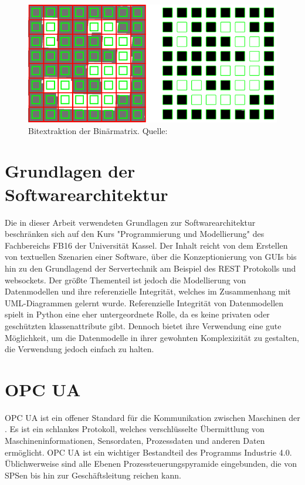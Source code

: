 \begin{figure}
    \caption{Bitextraktion der Binärmatrix. Quelle: \cite[OpenCV]{OpenCVaruco}}\label{fig:aruco6}
    \includegraphics[width = \textwidth]{Bilder/bitsextraction2.png}
    \centering
\end{figure}



\section{Grundlagen der Softwarearchitektur}

Die in dieser Arbeit verwendeten Grundlagen zur Softwarearchitektur beschränken sich auf den Kurs "Programmierung und Modellierung" des Fachbereichs
FB16 der Universität Kassel. Der Inhalt reicht von dem Erstellen von textuellen Szenarien einer Software, über die Konzeptionierung von GUIs bis hin
zu den Grundlagend der Servertechnik am Beispiel des REST Protokolls und websockets. 
Der größte Thementeil ist jedoch die Modellierung von Datenmodellen und ihre referenzielle Integrität, welches im Zusammenhang mit UML-Diagrammen gelernt wurde.
Referenzielle Integrität von Datenmodellen spielt in Python eine eher untergeordnete Rolle, da es keine privaten oder geschützten klassenattribute gibt. 
Dennoch bietet ihre Verwendung eine gute Möglichkeit, um die Datenmodelle in ihrer gewohnten Komplexizität zu gestalten, die
Verwendung jedoch einfach zu halten.

\section{OPC UA}

OPC UA ist ein offener Standard für die Kommunikation zwischen Maschinen der \cite[OPC Foundation]{OPCFoundation}. Es ist ein schlankes Protokoll, 
welches verschlüsselte Übermittlung von Maschineninformationen, Sensordaten, Prozessdaten und anderen Daten ermöglicht.
OPC UA ist ein wichtiger Bestandteil des Programms Industrie 4.0. 
Üblichwerweise sind alle Ebenen Prozessteuerungspyramide eingebunden, die von SPSen bis hin zur Geschäftsleitung reichen kann.


